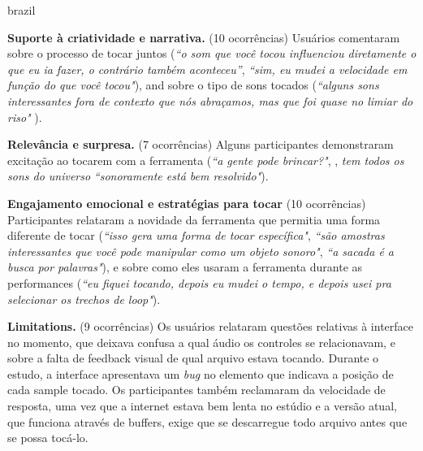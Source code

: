 \begin{otherlanguage*}{brazil}

\textbf{Suporte à criatividade e narrativa.} (10 ocorrências) Usuários comentaram sobre o processo de tocar juntos (\textit{``o som que você tocou influenciou diretamente o que eu ia fazer, o contrário também aconteceu''}, \textit{``sim, eu mudei a velocidade em função do que você tocou"}), and sobre o tipo de sons tocados (\textit{``alguns sons interessantes fora de contexto que nós abraçamos, mas que foi quase no limiar do riso"} ). 

\textbf{Relevância e surpresa.} (7 ocorrências) Alguns participantes demonstraram excitação ao tocarem com a ferramenta (\textit{``a gente pode brincar?"}, , \textit{tem todos os sons do universo} \textit{``sonoramente está bem resolvido"}).

\textbf{Engajamento emocional e estratégias para tocar} (10 ocorrências) Participantes relataram a novidade da ferramenta que permitia uma forma diferente de tocar (\textit{``isso gera uma forma de tocar específica"}, \textit{``são amostras interessantes que você pode manipular como um objeto sonoro"}, \textit{``a sacada é a busca por palavras"}), e sobre como eles usaram a ferramenta durante as performances (\textit{``eu fiquei tocando, depois eu mudei o tempo, e depois usei pra selecionar os trechos de loop"}).

\textbf{Limitations.} (9 ocorrências) Os usuários relataram questões relativas à interface no momento, que deixava confusa a qual áudio os controles se relacionavam, e sobre a falta de feedback visual de qual arquivo estava tocando. Durante o estudo, a interface apresentava um \emph{bug} no elemento que indicava a posição de cada sample tocado. Os participantes também reclamaram da velocidade de resposta, uma vez que a internet estava bem lenta no estúdio e a versão atual, que funciona através de buffers, exige que se descarregue todo arquivo antes que se possa tocá-lo.




\end{otherlanguage*}
